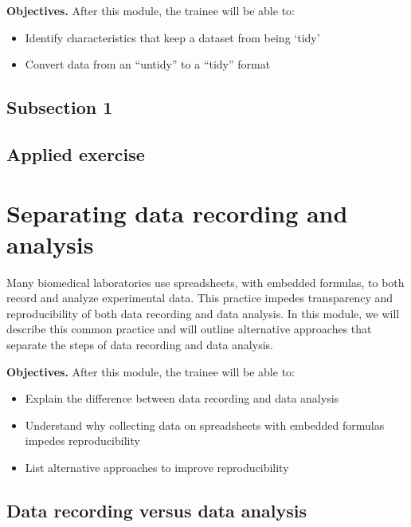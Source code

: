 \documentclass[]{tufte-book}
\providecommand{\tightlist}{%
  \setlength{\itemsep}{0pt}\setlength{\parskip}{0pt}}
\begin{document}
\textbf{Objectives.} After this module, the trainee will be able to:

\begin{itemize}
\tightlist
\item
  Identify characteristics that keep a dataset from being `tidy'
\item
  Convert data from an ``untidy'' to a ``tidy'' format
\end{itemize}

\hypertarget{subsection-1}{%
\subsection{Subsection 1}\label{subsection-1}}

\hypertarget{applied-exercise-1}{%
\subsection{Applied exercise}\label{applied-exercise-1}}

\hypertarget{separating-data-recording-and-analysis-1}{%
\section{Separating data recording and analysis}\label{separating-data-recording-and-analysis-1}}

Many biomedical laboratories use spreadsheets, with embedded formulas, to both
record and analyze experimental data. This practice impedes transparency and
reproducibility of both data recording and data analysis. In this module, we
will describe this common practice and will outline alternative approaches that
separate the steps of data recording and data analysis.

\textbf{Objectives.} After this module, the trainee will be able to:

\begin{itemize}
\tightlist
\item
  Explain the difference between data recording and data analysis
\item
  Understand why collecting data on spreadsheets with embedded formulas impedes
  reproducibility
\item
  List alternative approaches to improve reproducibility
\end{itemize}

\hypertarget{data-recording-versus-data-analysis-1}{%
\subsection{Data recording versus data analysis}\label{data-recording-versus-data-analysis-1}}
\end{document}
